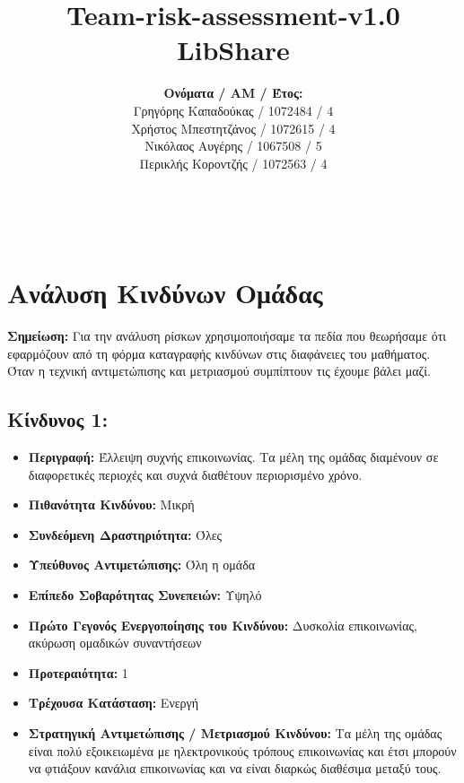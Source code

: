 \documentclass[12pt,a4paper]{article}
\title{Team-risk-assessment-v1.0\\ LibShare}
\author{\textbf{Ονόματα / ΑΜ / Έτος:} \\ Γρηγόρης Καπαδούκας / 1072484 / 4\textdegree \\ Χρήστος Μπεστητζάνος / 1072615 / 4\textdegree \\ Νικόλαος Αυγέρης / 1067508 / 5\textdegree \\ Περικλής Κοροντζής / 1072563 / 4\textdegree}
\begin{document}
\makeatletter
\begin{center}
	\LARGE{\@title} \\
	\pagebreak
    \begin{LARGE}\@author\end{LARGE}
    \pagebreak
\end{center}

\section{Ανάλυση Κινδύνων Ομάδας}

\textbf{Σημείωση:} Για την ανάλυση ρίσκων χρησιμοποιήσαμε τα πεδία που θεωρήσαμε ότι εφαρμόζουν από τη φόρμα καταγραφής κινδύνων στις διαφάνειες του μαθήματος. Όταν η τεχνική αντιμετώπισης και μετριασμού συμπίπτουν τις έχουμε βάλει μαζί.

\subsection*{Κίνδυνος 1:}
\begin{itemize}
	\item \textbf{Περιγραφή:} Έλλειψη συχνής επικοινωνίας. Τα μέλη της ομάδας διαμένουν σε διαφορετικές περιοχές και συχνά διαθέτουν περιορισμένο χρόνο.
	\item \textbf{Πιθανότητα Κινδύνου:} Μικρή
	\item \textbf{Συνδεόμενη Δραστηριότητα:} Όλες
	\item \textbf{Υπεύθυνος Αντιμετώπισης:} Όλη η ομάδα
	\item \textbf{Επίπεδο Σοβαρότητας Συνεπειών:} Υψηλό
	\item \textbf{Πρώτο Γεγονός Ενεργοποίησης του Κινδύνου:} Δυσκολία επικοινωνίας, ακύρωση ομαδικών συναντήσεων
	\item \textbf{Προτεραιότητα:} 1
	\item \textbf{Τρέχουσα Κατάσταση:} Ενεργή
	\item \textbf{Στρατηγική Αντιμετώπισης / Μετριασμού Κινδύνου:} Τα μέλη της ομάδας είναι  πολύ εξοικειωμένα με ηλεκτρονικούς τρόπους επικοινωνίας και έτσι μπορούν να φτιάξουν κανάλια επικοινωνίας και να είναι διαρκώς διαθέσιμα μεταξύ τους. 
\end{itemize}
\end{document}
